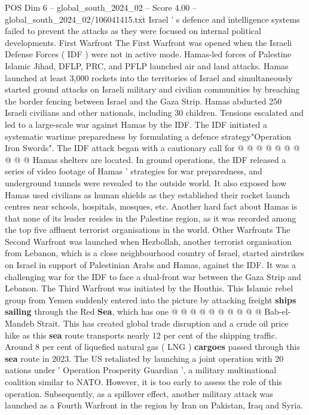 \begin{textsample}{POS Dim 6 – global\_south\_2024\_02 – Score 4.00 – global\_south\_2024\_02/106041415.txt}
Israel ' s defence and intelligence systems failed to prevent the attacks as they were focused on internal political developments.
First Warfront The First Warfront was opened when the Israeli Defense Forces ( IDF ) were not in active mode.
Hamas-led forces of Palestine Islamic Jihad, DFLP, PRC, and PFLP launched air and land attacks.
Hamas launched at least 3,000 rockets into the territories of Israel and simultaneously started ground attacks on Israeli military and civilian communities by breaching the border fencing between Israel and the Gaza Strip.
Hamas abducted 250 Israeli civilians and other nationals, including 30 children.
Tensions escalated and led to a large-scale war against Hamas by the IDF.
The IDF initiated a systematic wartime preparedness by formulating a defence strategy"Operation Iron Swords".
The IDF attack began with a cautionary call for @ @ @ @ @ @ @ @ @ @ Hamas shelters are located.
In ground operations, the IDF released a series of video footage of Hamas ' strategies for war preparedness, and underground tunnels were revealed to the outside world.
It also exposed how Hamas used civilians as human shields as they established their rocket launch centres near schools, hospitals, mosques, etc.
Another hard fact about Hamas is that none of its leader resides in the Palestine region, as it was recorded among the top five affluent terrorist organisations in the world.
Other Warfronts The Second Warfront was launched when Hezbollah, another terrorist organisation from Lebanon, which is a close neighbourhood country of Israel, started airstrikes on Israel in support of Palestinian Arabs and Hamas, against the IDF.
It was a challenging war for the IDF to face a dual-front war between the Gaza Strip and Lebanon.
The Third Warfront was initiated by the Houthis.
This Islamic rebel group from Yemen suddenly entered into the picture by attacking freight \textbf{ships} \textbf{sailing} through the Red \textbf{Sea}, which has one @ @ @ @ @ @ @ @ @ @ Bab-el-Mandeb Strait.
This has created global trade disruption and a crude oil price hike as this \textbf{sea} route transports nearly 12 per cent of the shipping traffic.
Around 8 per cent of liquefied natural gas ( LNG ) \textbf{cargoes} passed through this \textbf{sea} route in 2023.
The US retaliated by launching a joint operation with 20 nations under ' Operation Prosperity Guardian ', a military multinational coalition similar to NATO.
However, it is too early to assess the role of this operation.
Subsequently, as a spillover effect, another military attack was launched as a Fourth Warfront in the region by Iran on Pakistan, Iraq and Syria.

\end{textsample}
